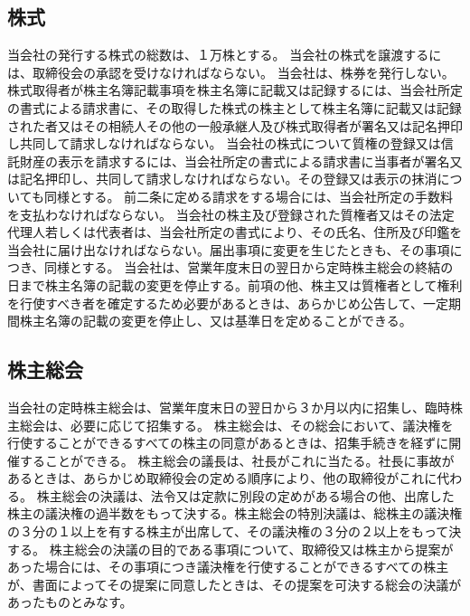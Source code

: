 \documentclass[10pt,a4paper,uplatex]{jsarticle}
\begin{document}
\subsection{株式}
当会社の発行する株式の総数は、１万株とする。
当会社の株式を譲渡するには、取締役会の承認を受けなければならない。
当会社は、株券を発行しない。
株式取得者が株主名簿記載事項を株主名簿に記載又は記録するには、当会社所定の書式による請求書に、その取得した株式の株主として株主名簿に記載又は記録された者又はその相続人その他の一般承継人及び株式取得者が署名又は記名押印し共同して請求しなければならない。
当会社の株式について質権の登録又は信託財産の表示を請求するには、当会社所定の書式による請求書に当事者が署名又は記名押印し、共同して請求しなければならない。その登録又は表示の抹消についても同様とする。
前二条に定める請求をする場合には、当会社所定の手数料を支払わなければならない。
当会社の株主及び登録された質権者又はその法定代理人若しくは代表者は、当会社所定の書式により、その氏名、住所及び印鑑を当会社に届け出なければならない。届出事項に変更を生じたときも、その事項につき、同様とする。
当会社は、営業年度末日の翌日から定時株主総会の終結の日まで株主名簿の記載の変更を停止する。前項の他、株主又は質権者として権利を行使すべき者を確定するため必要があるときは、あらかじめ公告して、一定期間株主名簿の記載の変更を停止し、又は基準日を定めることができる。

\subsection{株主総会}
当会社の定時株主総会は、営業年度末日の翌日から３か月以内に招集し、臨時株主総会は、必要に応じて招集する。
株主総会は、その総会において、議決権を行使することができるすべての株主の同意があるときは、招集手続きを経ずに開催することができる。
株主総会の議長は、社長がこれに当たる。社長に事故があるときは、あらかじめ取締役会の定める順序により、他の取締役がこれに代わる。
株主総会の決議は、法令又は定款に別段の定めがある場合の他、出席した株主の議決権の過半数をもって決する。株主総会の特別決議は、総株主の議決権の３分の１以上を有する株主が出席して、その議決権の３分の２以上をもって決する。
株主総会の決議の目的である事項について、取締役又は株主から提案があった場合には、その事項につき議決権を行使することができるすべての株主が、書面によってその提案に同意したときは、その提案を可決する総会の決議があったものとみなす。
\end{document}
